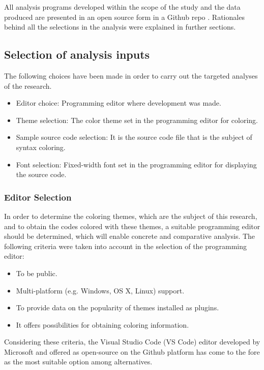 \documentclass{article}
\begin{document}
All analysis programs developed within the scope of the study and the data produced are presented in an open source form in a Github repo \cite{Oktas_Code_CCT_2022}. Rationales behind all the selections in the analysis were explained in further sections.

\subsection{Selection of analysis inputs} \label{sec:material-methods.inputs}

The following choices have been made in order to carry out the targeted analyses of the research.

\begin{itemize}
  \item Editor choice: Programming editor where development was made.
  \item Theme selection: The color theme set in the programming editor for coloring. 
  \item Sample source code selection: It is the source code file that is the subject of syntax coloring.
  \item Font selection: Fixed-width font set in the programming editor for displaying the source code.
\end{itemize}

\subsubsection{Editor Selection} \label{sec:material-methods.inputs.editor}

In order to determine the coloring themes, which are the subject of this research, and to obtain the codes colored with these themes, a suitable programming editor should be determined, which will enable concrete and comparative analysis. The following criteria were taken into account in the selection of the programming editor:

\begin{itemize}
  \item To be public.
  \item Multi-platform (e.g. Windows, OS X, Linux) support.
  \item To provide data on the popularity of themes installed as plugins.
  \item It offers possibilities for obtaining coloring information.
\end{itemize}

Considering these criteria, the Visual Studio Code (VS Code) editor developed by Microsoft and offered as open-source on the Github platform has come to the fore as the most suitable option among alternatives.
\end{document}
